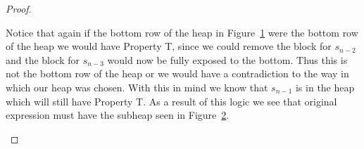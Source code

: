 \begin{theorem}
\begin{proof}
\begin{figure}[h!]
\caption{}\label{fig:heap4}
\end{figure}

Notice that again if the bottom row of the heap in Figure~\ref{fig:heap4} were the bottom row of the heap we would have Property T, since we could remove the block for $s_{n-2}$ and the block for $s_{n-3}$ would now be fully exposed to the bottom. Thus this is not the bottom row of the heap or we would have a contradiction to the way in which our heap was chosen. With this in mind we know that $s_{n-1}$ is in the heap which will still have Property T. As a result of this logic we see that original expression must have the subheap seen in Figure~\ref{fig:heap5}.
\begin{figure}[h!] \centering
{}
\caption{}\label{fig:heap5}
\end{figure}
	

\end{proof}
\end{theorem}
